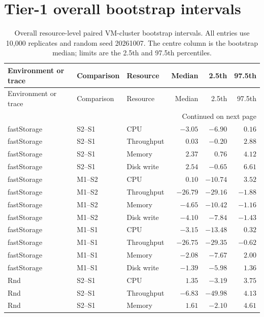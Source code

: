 \documentclass[a4paper,11pt]{article}
\begin{document}
\section*{Tier-1 overall bootstrap intervals}
\small
\begin{longtable}{@{}lllrrr@{}}
  \caption{Overall resource-level paired VM-cluster bootstrap intervals. All
  entries use 10,000 replicates and random seed 20261007. The centre column is
  the bootstrap median; limits are the 2.5th and 97.5th percentiles.}
  \label{tab:overall-bootstrap-intervals}\\
  \toprule
  Environment or trace & Comparison & Resource & Median & 2.5th & 97.5th \\
  \midrule
  \endfirsthead
  \toprule
  Environment or trace & Comparison & Resource & Median & 2.5th & 97.5th \\
  \midrule
  \endhead
  \midrule
  \multicolumn{6}{r}{Continued on next page}\\
  \endfoot
  \bottomrule
  \endlastfoot
  fastStorage & S2--S1 & CPU & $-3.05$ & $-6.90$ & $ 0.16$ \\
  fastStorage & S2--S1 & Throughput & $ 0.03$ & $-0.20$ & $ 2.88$ \\
  fastStorage & S2--S1 & Memory & $ 2.37$ & $ 0.76$ & $ 4.12$ \\
  fastStorage & S2--S1 & Disk write & $ 2.54$ & $-0.65$ & $ 6.61$ \\
  fastStorage & M1--S2 & CPU & $ 0.10$ & $-10.74$ & $ 3.52$ \\
  fastStorage & M1--S2 & Throughput & $-26.79$ & $-29.16$ & $-1.88$ \\
  fastStorage & M1--S2 & Memory & $-4.65$ & $-10.42$ & $-1.16$ \\
  fastStorage & M1--S2 & Disk write & $-4.10$ & $-7.84$ & $-1.43$ \\
  fastStorage & M1--S1 & CPU & $-3.15$ & $-13.48$ & $ 0.32$ \\
  fastStorage & M1--S1 & Throughput & $-26.75$ & $-29.35$ & $-0.62$ \\
  fastStorage & M1--S1 & Memory & $-2.08$ & $-7.67$ & $ 2.00$ \\
  fastStorage & M1--S1 & Disk write & $-1.39$ & $-5.98$ & $ 1.36$ \\
  Rnd & S2--S1 & CPU & $ 1.35$ & $-3.19$ & $ 3.75$ \\
  Rnd & S2--S1 & Throughput & $-6.83$ & $-49.98$ & $ 4.13$ \\
  Rnd & S2--S1 & Memory & $ 1.61$ & $-2.10$ & $ 4.61$ \\

\end{longtable}
\end{document}
